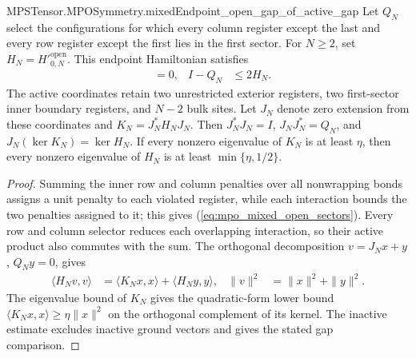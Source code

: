 \begin{lemma}
{        MPSTensor.MPOSymmetry.mixedEndpoint_open_gap_of_active_gap}
    \leanok
    Let $Q_N$ select the configurations for which every column register
    except the last and every row register except the first lies in
    the first sector. For $N\geq2$, set
    $H_N=H'^{\mathrm{open}}_{0,N}$. This endpoint Hamiltonian satisfies
    \begin{align}
        [Q_N,H_N] & =0,
                  & I-Q_N & \leq2H_N.
        \label{eq:mpo_mixed_open_sectors}
    \end{align}
    The active coordinates retain two unrestricted exterior registers,
    two first-sector inner boundary registers, and $N-2$ bulk sites.
    Let $J_N$ denote zero extension from these coordinates and
    $K_N=J_N^*H_NJ_N$. Then $J_N^*J_N=I$, $J_NJ_N^*=Q_N$, and
    $J_N(\ker K_N)=\ker H_N$. If every nonzero eigenvalue of $K_N$ is at
    least $\eta$, then every nonzero eigenvalue of $H_N$ is at least
    $\min\{\eta,1/2\}$.
\end{lemma}
\begin{proof}
    \leanok
    Summing the inner row and column penalties over all nonwrapping bonds
    assigns a unit penalty to each violated register, while each interaction
    bounds the two penalties assigned to it; this gives
    (\ref{eq:mpo_mixed_open_sectors}). Every row and column selector
    reduces each overlapping interaction, so their active product also
    commutes with the sum. The orthogonal decomposition
    $v=J_Nx+y$, $Q_Ny=0$, gives
    \begin{align}
        \langle H_Nv,v\rangle
         & =\langle K_Nx,x\rangle+\langle H_Ny,y\rangle,
         & \|v\|^2                                       & =\|x\|^2+\|y\|^2.
    \end{align}
    The eigenvalue bound of $K_N$ gives the quadratic-form lower bound
    $\langle K_Nx,x\rangle\geq\eta\|x\|^2$ on the orthogonal complement of
    its kernel. The inactive estimate excludes inactive ground vectors
    and gives the stated gap comparison.
\end{proof}

